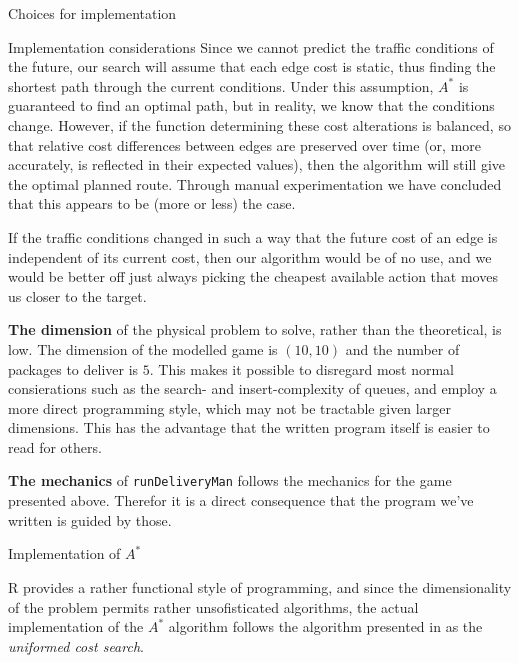 \begin{subsection}{Choices for implementation}
\begin{subsubsection}{Implementation considerations}
        Since we cannot predict the traffic conditions of the future, our search will assume that each edge cost is static, thus finding the shortest path through the current conditions. Under this assumption, $A^*$ is guaranteed to find an optimal path, but in reality, we know that the conditions change. However, if the function determining these cost alterations is balanced, so that relative cost differences between edges are preserved over time (or, more accurately, is reflected in their expected values), then the algorithm will still give the optimal planned route. Through manual experimentation we have concluded that this appears to be (more or less) the case.
	
	  If the traffic conditions changed in such a way that the future cost of an edge is independent of its current cost, then our algorithm would be of no use, and we would be better off just always picking the cheapest available action that moves us closer to the target.

      \textbf{The dimension} of the physical problem to solve, rather than the theoretical, is low. The dimension of the modelled game is $(10, 10)$ and the number of packages to deliver is $5$. This makes it possible to disregard most normal consierations such as the search- and insert-complexity of queues, and employ a more direct programming style, which may not be tractable given larger dimensions. This has the advantage that the written program itself is easier to read for others. 
	  
    \end{subsubsection}

    \textbf{The mechanics} of \texttt{runDeliveryMan} follows the mechanics for the game presented above. Therefor it is a direct consequence that the program we've written is guided by those. 



  \end{subsection}

  \begin{subsection}{Implementation of $A^*$ }
        \begingroup
        \setlength{\parskip}{0em}

        R provides a rather functional style of programming, and since the dimensionality of the problem permits rather unsofisticated algorithms, the actual implementation of the $A^*$ algorithm follows the algorithm presented in \cite{rn} as the \textit{uniformed cost search}.
        \endgroup
    \end{subsection}